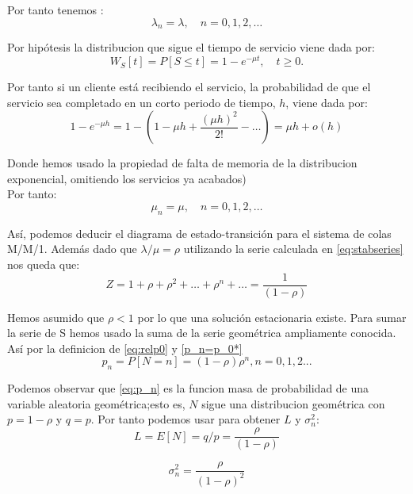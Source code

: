\documentclass[a4paper,10pt]{scrartcl}
\theoremstyle{definition}
\numberwithin{equation}{section}
\begin{document}
Por tanto tenemos :
\begin{equation*}
  \lambda_n=\lambda, \quad n=0,1,2,\dots
\end{equation*}

Por hipótesis la distribucion que sigue el tiempo de servicio viene dada por:
\begin{equation*}
  W_S[t] = P[S\leq t] = 1-e^{-\mu t}, \quad t\ge 0.
\end{equation*}

Por tanto si un cliente está recibiendo el servicio, la probabilidad de que el servicio sea completado en un corto periodo de tiempo, $h$, viene dada por:
\begin{equation*}
1-e^{-\mu h} = 1 - \left(1-\mu h+\frac{(\mu h)^2}{2!}- \dots\right)=\mu h +o(h)
\end{equation*}

Donde hemos usado la propiedad de falta de memoria de la distribucion exponencial, omitiendo los servicios ya acabados)\\
Por tanto:
\begin{equation*}
\mu_n=\mu, \quad n=0,1,2,\dots
\end{equation*}

Así, podemos deducir el diagrama de estado-transición para el sistema de colas M/M/1. Además dado que $\lambda/\mu=\rho$ utilizando la serie calculada en \ref{eq:stabseries} nos queda que:
\begin{equation*}
Z=1+\rho+\rho^2+\dots+\rho^n+\dots=\frac{1}{(1-\rho)}
\end{equation*}

Hemos asumido que $\rho<1$ por lo que una solución estacionaria existe.
Para sumar la serie de S hemos usado la suma de la serie geométrica ampliamente conocida.
Así por la definicion de \ref{eq:relp0} y \ref{p_n=p_0*}
\begin{equation}
  p_n=P[N=n]=(1-\rho)\rho^n, n=0,1,2...
\label{eq:p_n}
\end{equation}

Podemos observar que \ref{eq:p_n} es la funcion masa de probabilidad de una variable aleatoria geométrica;esto
es, $N$ sigue una distribucion geométrica con $p=1-\rho$ y $q=p$. Por tanto podemos usar para obtener $L$ 
y $\sigma_n^2$:
\begin{equation*}
  L=E[N]=q/p=\frac{\rho}{(1-\rho)}
\end{equation*}

\begin{equation*}
  \sigma_n^2=\frac{\rho}{(1-\rho)^2}
\end{equation*}
\end{document}

